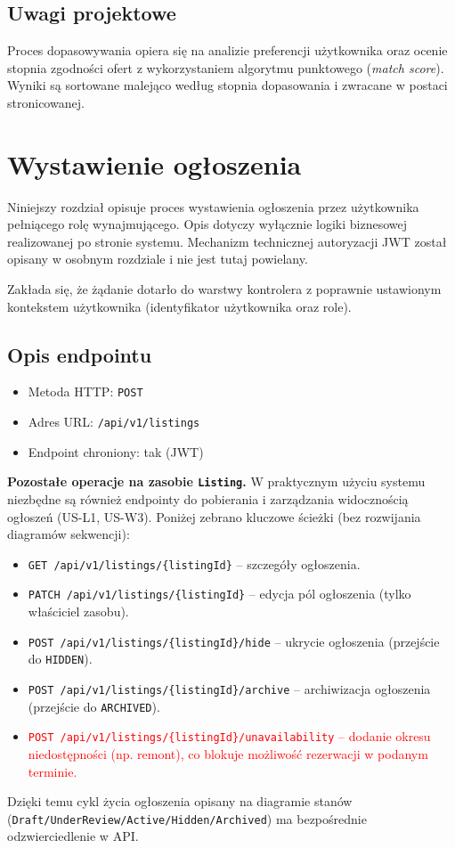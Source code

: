 \documentclass[11pt, a4paper]{article}
\begin{document}
\subsection{Uwagi projektowe}

Proces dopasowywania opiera się na analizie preferencji użytkownika oraz
ocenie stopnia zgodności ofert z wykorzystaniem algorytmu punktowego
(\textit{match score}). Wyniki są sortowane malejąco według stopnia dopasowania
i zwracane w postaci stronicowanej.

\section{Wystawienie ogłoszenia}

Niniejszy rozdział opisuje proces wystawienia ogłoszenia przez użytkownika
pełniącego rolę wynajmującego. Opis dotyczy wyłącznie logiki biznesowej
realizowanej po stronie systemu. Mechanizm technicznej autoryzacji JWT został
opisany w osobnym rozdziale i nie jest tutaj powielany.

Zakłada się, że żądanie dotarło do warstwy kontrolera z poprawnie ustawionym
kontekstem użytkownika (identyfikator użytkownika oraz role).

\subsection{Opis endpointu}

\begin{itemize}
    \item Metoda HTTP: \texttt{POST}
    \item Adres URL: \texttt{/api/v1/listings}
    \item Endpoint chroniony: tak (JWT)
\end{itemize}

\noindent\textbf{Pozostałe operacje na zasobie \texttt{Listing}.} W praktycznym użyciu systemu niezbędne są również endpointy do pobierania i zarządzania widocznością ogłoszeń (US-L1, US-W3). Poniżej zebrano kluczowe ścieżki (bez rozwijania diagramów sekwencji):
\begin{itemize}
    \item \texttt{GET /api/v1/listings/\{listingId\}} -- szczegóły ogłoszenia.
    \item \texttt{PATCH /api/v1/listings/\{listingId\}} -- edycja pól ogłoszenia (tylko właściciel zasobu).
    \item \texttt{POST /api/v1/listings/\{listingId\}/hide} -- ukrycie ogłoszenia (przejście do \texttt{HIDDEN}).
    \item \texttt{POST /api/v1/listings/\{listingId\}/archive} -- archiwizacja ogłoszenia (przejście do \texttt{ARCHIVED}).
    \item \textcolor{red}{\texttt{POST /api/v1/listings/\{listingId\}/unavailability} -- dodanie okresu niedostępności (np. remont), co blokuje możliwość rezerwacji w podanym terminie.}
\end{itemize}
Dzięki temu cykl życia ogłoszenia opisany na diagramie stanów \\
(\texttt{Draft/UnderReview/Active/Hidden/Archived}) ma bezpośrednie odzwierciedlenie w API.
\end{document}
